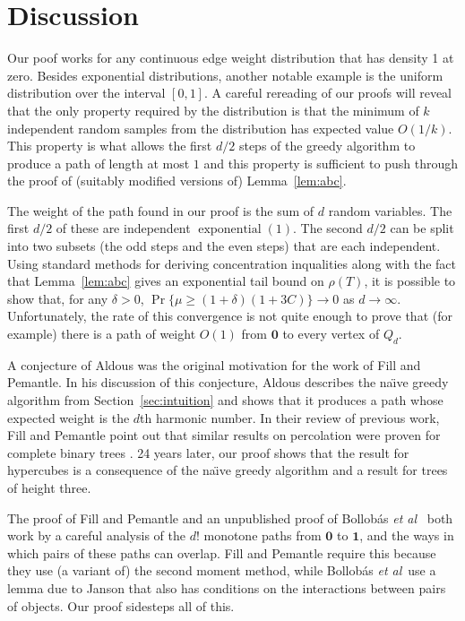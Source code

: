 \documentclass[a4paper,UKenglish]{lipics-v2016}
\DeclareMathOperator{\exponential}{exponential}
\newcommand{\zero}{\mathbf{0}}
\newcommand{\one}{\mathbf{1}}
\newcommand{\etal}{\emph{et al}}
\begin{document}
\section{Discussion}

Our poof works for any continuous edge weight distribution that has
density 1 at zero. Besides exponential distributions, another notable
example is the uniform distribution over the interval $[0,1]$.  A careful
rereading of our proofs will reveal that the only property required by
the distribution is that the minimum of $k$ independent random samples
from the distribution has expected value $O(1/k)$. This property is what
allows the first $d/2$ steps of the greedy algorithm to produce a path
of length at most $1$ and this property is sufficient to push through
the proof of (suitably modified versions of) Lemma~\ref{lem:abc}.

The weight of the path found in our proof is the sum of $d$ random
variables. The first $d/2$ of these are independent $\exponential(1)$. The
second $d/2$ can be split into two subsets (the odd steps and the even
steps) that are each independent.  Using standard methods for deriving
concentration inqualities along with the fact that Lemma~\ref{lem:abc}
gives an exponential tail bound on $\rho(T)$, it is possible to show
that, for any $\delta >0$, $\Pr\{\mu\ge (1+\delta)(1+3C)\}\rightarrow 0$
as $d\rightarrow\infty$.  Unfortunately, the rate of this convergence is
not quite enough to prove that (for example) there is a path of weight
$O(1)$ from $\zero$ to every vertex of $Q_d$.

A conjecture of Aldous \cite[Conjecture~G7.1]{aldous:probability}
was the original motivation for the work of Fill and Pemantle.  In his
discussion of this conjecture, Aldous describes the na\"{\i}ve greedy
algorithm from Section~\ref{sec:intuition} and shows that it produces a
path whose expected weight is the $d$th harmonic number.  In their review
of previous work, Fill and Pemantle \cite{fill.pemantle:percolation}
point out that similar results on percolation were proven for complete
binary trees \cite{pemantle:phase}.  24 years later, our proof shows
that the result for hypercubes is a consequence of the na\"{\i}ve greedy
algorithm and a result for trees of height three.

The proof of Fill and Pemantle \cite{fill.pemantle:percolation}
and an unpublished proof of Bollob\'as \etal\
\cite{balister.bollobas.ea:first-passage} both work by a careful analysis
of the $d!$ monotone paths from $\zero$ to $\one$, and the ways in which
pairs of these paths can overlap.  Fill and Pemantle require this because
they use (a variant of) the second moment method, while Bollob\'as \etal\
use a lemma due to Janson that also has conditions on the interactions
between pairs of objects. Our proof sidesteps all of this.
\end{document}
